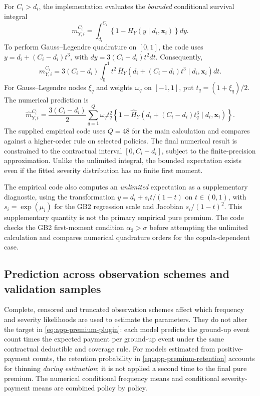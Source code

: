 \documentclass[11pt]{article}
\begin{document}
{For $C_i>d_i$, the implementation evaluates the \emph{bounded}
conditional survival integral
\begin{equation}
 m_{Y,i}^{C_i}
 =\int_{d_i}^{C_i}\left\{1-H_Y(y\mid d_i,\boldsymbol{x}_i)\right\}dy.
 \label{eq:app-premium-emp-integral}
\end{equation}
To perform Gauss--Legendre quadrature on $[0,1]$, the code uses
$y=d_i+(C_i-d_i)t^3$, with
$dy=3(C_i-d_i)t^2dt$. Consequently,
\begin{equation}
 m_{Y,i}^{C_i}
 =3(C_i-d_i)\int_0^1
      t^2\,\overline H_Y\!\left(d_i+(C_i-d_i)t^3
             \mid d_i,\boldsymbol{x}_i\right)dt.
 \label{eq:app-premium-emp-transform}
\end{equation}
For Gauss--Legendre nodes $\xi_q$ and weights $\omega_q$ on $[-1,1]$,
put $t_q=(1+\xi_q)/2$. The numerical prediction is
\begin{equation}
 \widehat m_{Y,i}^{C_i}
 =\frac{3(C_i-d_i)}{2}\sum_{q=1}^{Q}\omega_q t_q^2
    \left\{1-\widehat H_Y\!\left(
       d_i+(C_i-d_i)t_q^3\mid d_i,\boldsymbol{x}_i
    \right)\right\}.
 \label{eq:app-premium-emp-quadrature}
\end{equation}
The supplied empirical code uses $Q=48$ for the main calculation and
compares against a higher-order rule on selected policies. The final
numerical result is constrained to the contractual interval
$[0,C_i-d_i]$, subject to the finite-precision approximation.
Unlike the unlimited integral, the bounded expectation exists even if
the fitted severity distribution has no finite first moment.

The empirical code also computes an \emph{unlimited} expectation as a
supplementary diagnostic, using the transformation
$y=d_i+s_i t/(1-t)$ on $t\in(0,1)$, with $s_i=\exp(\mu_i)$ for the
GB2 regression scale and Jacobian $s_i/(1-t)^2$. This supplementary
quantity is not the primary empirical pure premium. The code checks the
GB2 first-moment condition $\alpha_2>\sigma$ before attempting the
unlimited calculation and compares numerical quadrature orders for the
copula-dependent case.

\subsection{Prediction across observation schemes and validation samples}
\label{app:premium-validation}

Complete, censored and truncated observation schemes affect which
frequency and severity likelihoods are used to estimate the parameters.
They do not alter the target in \eqref{eq:app-premium-plugin}: each model
predicts the ground-up event count times the expected payment per
ground-up event under the same contractual deductible and coverage rule.
For models estimated from positive-payment counts, the retention
probability in \eqref{eq:app-premium-retention} accounts for thinning
\emph{during estimation}; it is not applied a second time to the final
pure premium. The numerical conditional frequency means and conditional
severity-payment means are combined policy by policy.

}
\end{document}
